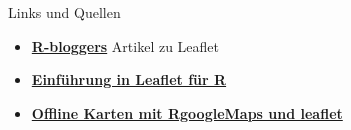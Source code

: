 \documentclass[ignorenonframetext,]{beamer}
\begin{document}
\begin{frame}{Links und Quellen}
\protect\hypertarget{links-und-quellen}{}

\begin{itemize}
\item
  \href{http://www.r-bloggers.com/the-leaflet-package-for-online-mapping-in-r/}{\textbf{R-bloggers}}
  Artikel zu Leaflet
\item
  \href{https://rstudio.github.io/leaflet/}{\textbf{Einführung in
  Leaflet für R}}
\item
  \href{https://blog.hwr-berlin.de/codeandstats/category/scientific-software/r/}{\textbf{Offline
  Karten mit RgoogleMaps und leaflet}}
\end{itemize}

\end{frame}
\end{document}
